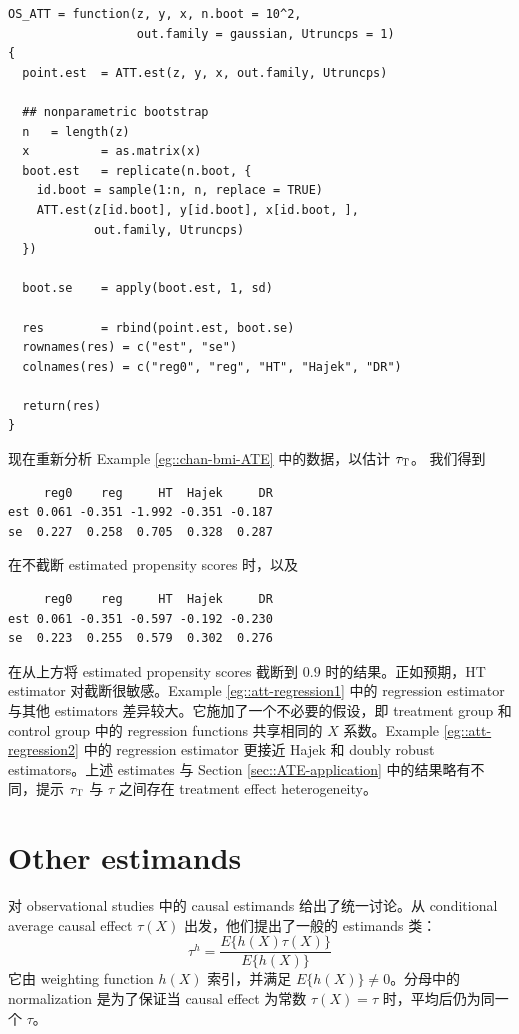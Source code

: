\begin{lstlisting}
OS_ATT = function(z, y, x, n.boot = 10^2,
                  out.family = gaussian, Utruncps = 1)
{
  point.est  = ATT.est(z, y, x, out.family, Utruncps)
  
  ## nonparametric bootstrap
  n   = length(z)
  x          = as.matrix(x)
  boot.est   = replicate(n.boot, {
    id.boot = sample(1:n, n, replace = TRUE)
    ATT.est(z[id.boot], y[id.boot], x[id.boot, ], 
            out.family, Utruncps)
  })
  
  boot.se    = apply(boot.est, 1, sd)
  
  res        = rbind(point.est, boot.se)
  rownames(res) = c("est", "se")
  colnames(res) = c("reg0", "reg", "HT", "Hajek", "DR")
  
  return(res)
}
\end{lstlisting}

 
现在重新分析 Example \ref{eg::chan-bmi-ATE} 中的数据，以估计 $\tau_\textsc{T}$。
我们得到
\begin{lstlisting}
     reg0    reg     HT  Hajek     DR
est 0.061 -0.351 -1.992 -0.351 -0.187
se  0.227  0.258  0.705  0.328  0.287
\end{lstlisting}
在不截断 estimated propensity scores 时，以及
\begin{lstlisting}
     reg0    reg     HT  Hajek     DR
est 0.061 -0.351 -0.597 -0.192 -0.230
se  0.223  0.255  0.579  0.302  0.276
\end{lstlisting}
在从上方将 estimated propensity scores 截断到 $0.9$ 时的结果。正如预期，HT estimator 对截断很敏感。Example \ref{eg::att-regression1} 中的 regression estimator 与其他 estimators 差异较大。它施加了一个不必要的假设，即 treatment group 和 control group 中的 regression functions 共享相同的 $X$ 系数。Example \ref{eg::att-regression2} 中的 regression estimator 更接近 Hajek 和 doubly robust estimators。上述 estimates 与 Section \ref{sec::ATE-application} 中的结果略有不同，提示 $\tau_\textsc{T}$ 与 $\tau$ 之间存在 treatment effect heterogeneity。



\section{Other estimands}\label{sec::other-estmand-overlap}


\citet{li2018balancing} 对 observational studies 中的 causal estimands 给出了统一讨论。从 conditional average causal effect $\tau(X)$ 出发，他们提出了一般的 estimands 类：
$$
\tau^h =  \frac{  E\{ h(X) \tau(X)  \} }{ E\{ h(X)   \} }
$$
它由 weighting function $h(X)$ 索引，并满足 $E\{ h(X)   \}  \neq 0$。分母中的 normalization 是为了保证当 causal effect 为常数 $\tau(X) = \tau$ 时，平均后仍为同一个 $\tau$。


